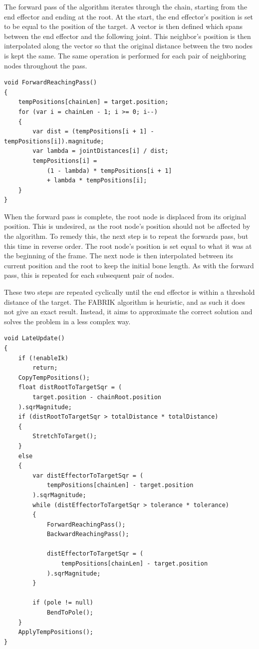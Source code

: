 The forward pass of the algorithm iterates through the chain, starting from the
end effector and ending at the root. At the start, the end effector's position
is set to be equal to the position of the target. A vector is then defined which
spans between the end effector and the following joint. This neighbor's position
is then interpolated along the vector so that the original distance between the
two nodes is kept the same. The same operation is performed for each pair of
neighboring nodes throughout the pass. 

\begin{lstlisting}[basicstyle=\footnotesize, numbers=none,frame=single,
caption={FABRIK forward reaching pass. \textit{Fabrik.cs}},captionpos=b, label=forwards, language={[Sharp]c}]
void ForwardReachingPass()
{
    tempPositions[chainLen] = target.position;
    for (var i = chainLen - 1; i >= 0; i--)
    {
        var dist = (tempPositions[i + 1] - tempPositions[i]).magnitude;
        var lambda = jointDistances[i] / dist;
        tempPositions[i] =
            (1 - lambda) * tempPositions[i + 1]
            + lambda * tempPositions[i];
    }
}
\end{lstlisting}

When the forward pass is complete, the root node is displaced from its original
position. This is undesired, as the root node's position should not be affected
by the algorithm. To remedy this, the next step is to repeat the forwards pass,
but this time in reverse order. The root node's position is set equal to what it was
at the beginning of the frame. The next node is then interpolated between its
current position and the root to keep the initial bone length. As with the
forward pass, this is repeated for each subsequent pair of nodes. 

These two steps are repeated cyclically until the end effector is within
a threshold distance of the target. The FABRIK algorithm is heuristic, and as
such it does not give an exact result. Instead, it aims to approximate the
correct solution and solves the problem in a less complex way.

\begin{lstlisting}[basicstyle=\footnotesize, numbers=none,frame=single,
caption={Full execution of the FABRIK algorithm in each frame.
\textit{Fabrik.cs}},captionpos=b, label=full_loop, language={[Sharp]c}]
void LateUpdate()
{
    if (!enableIk)
        return;
    CopyTempPositions();
    float distRootToTargetSqr = (
        target.position - chainRoot.position
    ).sqrMagnitude;
    if (distRootToTargetSqr > totalDistance * totalDistance)
    {
        StretchToTarget();
    }
    else
    {
        var distEffectorToTargetSqr = (
            tempPositions[chainLen] - target.position
        ).sqrMagnitude;
        while (distEffectorToTargetSqr > tolerance * tolerance)
        {
            ForwardReachingPass();
            BackwardReachingPass();

            distEffectorToTargetSqr = (
                tempPositions[chainLen] - target.position
            ).sqrMagnitude;
        }

        if (pole != null)
            BendToPole();
    }
    ApplyTempPositions();
}
\end{lstlisting}

